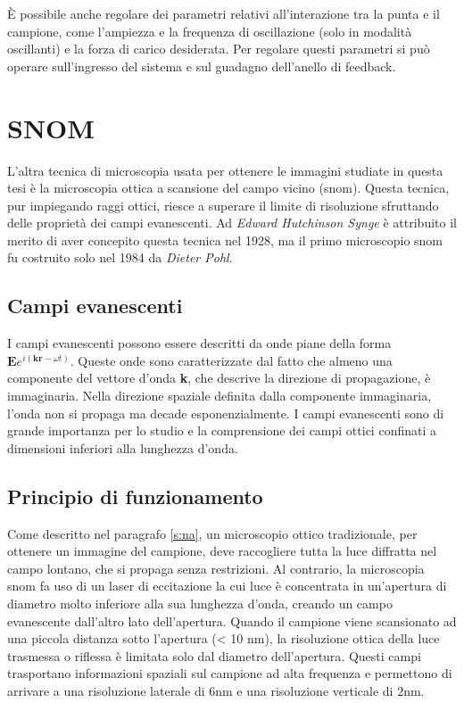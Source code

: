 \documentclass[../main.tex]{subfiles}
\begin{document}
È possibile anche regolare dei parametri relativi all'interazione tra la punta e il campione, come l'ampiezza e la frequenza di oscillazione (solo in modalità oscillanti) e la forza di carico desiderata. Per regolare questi parametri si può operare sull'ingresso del sistema e sul guadagno dell'anello di feedback.\\


\section{SNOM}

L'altra tecnica di microscopia usata per ottenere le immagini studiate in questa tesi è la microscopia ottica a scansione del campo vicino (\acrshort{snom}). Questa tecnica, pur impiegando raggi ottici, riesce a superare il limite di risoluzione sfruttando delle proprietà dei campi evanescenti. Ad \textit{Edward Hutchinson Synge} è attribuito il merito di aver concepito questa tecnica nel 1928,\cite{synge_1928} ma il primo microscopio \acrshort{snom} fu costruito solo nel 1984 da \textit{Dieter Pohl}.\cite{pohl_1984}

\subsection{Campi evanescenti}

I campi evanescenti possono essere descritti da onde piane della forma $\mathbf{E}e^{i(\mathbf{kr}-\omega t)}$. Queste onde sono caratterizzate dal fatto che almeno una componente del vettore d'onda \textbf{k}, che descrive la direzione di propagazione, è immaginaria. Nella direzione spaziale definita dalla componente immaginaria, l'onda non si propaga ma decade esponenzialmente. I campi evanescenti sono di grande importanza per lo studio e la comprensione dei campi ottici confinati a dimensioni inferiori alla lunghezza d'onda.\cite{novotny_2012}

\subsection{Principio di funzionamento}

Come descritto nel paragrafo \ref{s:na}, un microscopio ottico tradizionale, per ottenere un immagine del campione, deve raccogliere tutta la luce diffratta nel campo lontano, che si propaga senza restrizioni.
Al contrario, la microscopia \acrshort{snom} fa uso di un laser di eccitazione la cui luce è concentrata in un'apertura di diametro molto inferiore alla sua lunghezza d'onda, creando un campo evanescente dall'altro lato dell'apertura.\cite{betzig_1992} Quando il campione viene scansionato ad una piccola distanza sotto l'apertura (< 10 nm), la risoluzione ottica della luce trasmessa o riflessa è limitata solo dal diametro dell'apertura. Questi campi trasportano informazioni spaziali sul campione ad alta frequenza e permettono di arrivare a una risoluzione laterale di 6nm\cite{ma_2021} e una risoluzione verticale di 2nm.\cite{oshikane_2007}\\
\end{document}
